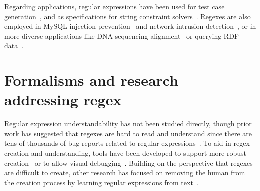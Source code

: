 Regarding applications, regular expressions have been used for test case generation~\cite{Ghosh:2013:JAT:2486788.2486925, Galler:2014:STD:2683035.2683100, Anand:2013:OSM:2503903.2503991, Tillmann:2014:TAT:2642937.2642941},  and
as specifications for string constraint solvers~\cite{Trinh:2014:SSS:2660267.2660372, hampi}.
Regexes are also employed in MySQL injection prevention~\cite{Yeole:2011:ADT:1980022.1980229} and network intrusion detection~\cite{network}, or in more diverse applications like DNA sequencing alignment~\cite{1594922} or querying RDF data~\cite{Lee:2010:PSQ:1871871.1871877, Alkhateeb:2009:ESR:1540656.1540975}.


\section{Formalisms and research addressing regex}

Regular expression understandability has not been studied directly, though prior work has suggested that regexes are hard to read and understand since there are tens of thousands of bug reports related to regular expressions~\cite{Spishak:2012:TSR:2318202.2318207}.
To aid in regex creation and understanding,  tools have been developed to support more robust creation~\cite{Spishak:2012:TSR:2318202.2318207} or to allow visual debugging~\cite{Beck:2014:RVD:2591062.2591111}. Building on the perspective that regexes are difficult to create, other research has focused on removing the human from the creation process by learning regular expressions from  text~\cite{Babbar:2010:CBA:1871840.1871848, Li:2008:REL:1613715.1613719}.





